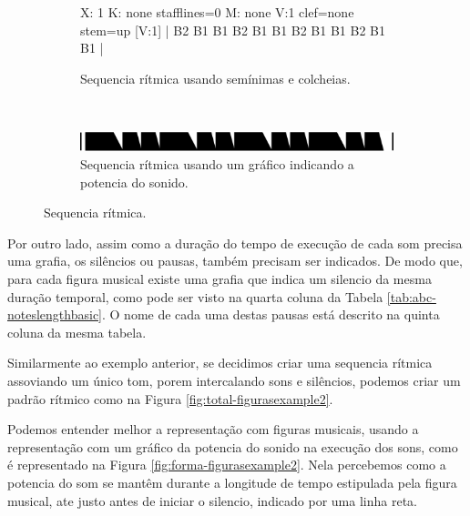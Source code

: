 \begin{figure}[h]
    \centering
    \begin{subfigure}[b]{0.9\textwidth}
 \begin{abc}[name=abc-figurasexample1]
%
X: 1 %
K: none stafflines=0 %
M:  none %
V:1 clef=none stem=up %
%
[V:1] | B2 B1 B1 B2 B1 B1 B2 B1 B1 B2  B1 B1   |
%       
\end{abc}
	\caption{Sequencia rítmica usando semínimas e colcheias.}
	\label{fig:abc-figurasexample1}
    \end{subfigure}
    ~%
    \begin{subfigure}[b]{0.9\textwidth}
        \includegraphics[width=\textwidth]{chapters/cap-musica-basica/forma-figurasexample1.eps}
        \caption{Sequencia rítmica usando um gráfico indicando a potencia do sonido.}
        \label{fig:forma-figurasexample1}
    \end{subfigure}
    \caption{Sequencia rítmica.}\label{fig:total-figurasexample1}
\end{figure}


Por outro lado, assim como a duração do tempo de execução de cada som precisa uma grafia,
os silêncios ou pausas, também precisam ser indicados. 
De modo que, para cada figura musical existe uma grafia que indica um silencio da mesma duração temporal,
como pode ser visto na quarta coluna da Tabela \ref{tab:abc-noteslengthbasic}.
O nome de cada uma destas pausas está descrito na quinta coluna da mesma tabela.

\begin{example}
Similarmente ao exemplo anterior, se decidimos criar uma sequencia rítmica assoviando um único tom, porem
intercalando sons e silêncios, podemos criar um padrão rítmico como na Figura \ref{fig:total-figurasexample2}.

Podemos entender melhor a representação com figuras musicais, 
usando a representação com um gráfico da potencia do sonido na execução dos sons,
como é representado na Figura \ref{fig:forma-figurasexample2}.
Nela percebemos como a potencia do som se mantêm durante a longitude de tempo estipulada pela figura musical, 
ate justo antes de iniciar o silencio, indicado por uma linha reta.
\end{example} 


